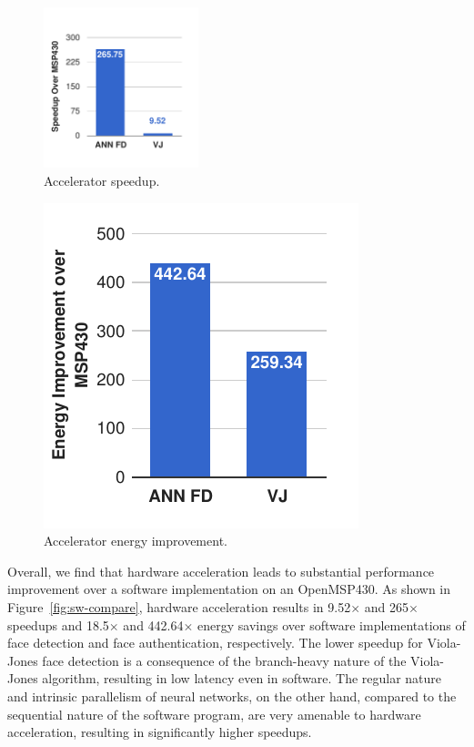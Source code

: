          \begin{figure}[h]
         \centering
             \begin{center}
               \includegraphics[width=0.4\textwidth]{nsp-figs/software_speedup.pdf}
             \end{center}
             \caption{Accelerator speedup.}
             \label{fig:sw-compare:speed}
         \end{figure}
     \begin{figure}[h]
         \centering
         \begin{center}
         \includegraphics[width=.4\textwidth]{nsp-figs/software_energy.pdf}
       \end{center}
         \caption{Accelerator energy improvement.}
         \label{fig:sw-compare:energy}
     \end{figure}

Overall, we find that hardware acceleration leads to substantial
performance improvement over a software implementation on an OpenMSP430.
As shown in Figure~\ref{fig:sw-compare}, hardware acceleration results in 9.52$\times$ and 265$\times$ speedups and 18.5$\times$
and 442.64$\times$
energy savings over software implementations of face detection and face authentication, respectively.
The lower speedup for Viola-Jones face detection is a consequence of the branch-heavy
nature of the Viola-Jones algorithm, resulting in low latency even in software. The regular nature and intrinsic parallelism of neural networks, on the other hand, compared to the sequential nature of the software program, are very amenable to hardware acceleration, resulting in significantly higher speedups.

